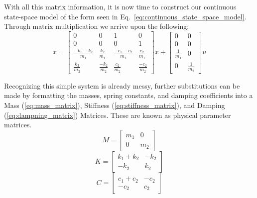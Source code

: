 With all this matrix information, it is now time to construct our continuous state-space model of the form seen in Eq.~\ref{eq:continuous_state_space_model}. Through matrix multiplication we arrive upon the following:
\begin{equation} 
    \dot x =
    \begin{bmatrix}
        0 & 0 & 1 & 0 \\
        0 & 0 & 0 & 1 \\
        \frac{-k_1-k_2}{m_1} & \frac{k_2}{m_1} & \frac{-c_1-c_2}{m_1} & \frac{c_2}{m_1} \\
        \frac{k_2}{m_2} & \frac{-k_2}{m_2} & \frac{c_2}{m_2} & \frac{-c_2}{m_2}
    \end{bmatrix}
    x +
    \begin{bmatrix}
        0 & 0 \\
        0 & 0 \\
        \frac{1}{m_1} & 0 \\
        0 & \frac{1}{m_2}
    \end{bmatrix}
    u
    \label{eq:spring_mass_state_space_continuous}
\end{equation}

Recognizing this simple system is already messy, further substitutions can be made by formatting the masses, spring constants, and damping coefficients into a Mass (\ref{eq:mass_matrix}), Stiffness (\ref{eq:stiffness_matrix}), and Damping (\ref{eq:dampning_matrix}) Matrices. These are known as physical parameter matrices.
\begin{equation}
    M = 
    \begin{bmatrix}
        m_1 & 0 \\
        0 & m_2
    \end{bmatrix}
    \label{eq:mass_matrix}
\end{equation}
\begin{equation}
    K =
    \begin{bmatrix}
        k_1 + k_2 & -k_2 \\
        -k_2 & k_2
    \end{bmatrix}
    \label{eq:stiffness_matrix}
\end{equation}
\begin{equation}
    C = 
    \begin{bmatrix}
        c_1 + c_2 & -c_2 \\
        -c_2 & c_2
    \end{bmatrix}
    \label{eq:dampning_matrix}
\end{equation}

